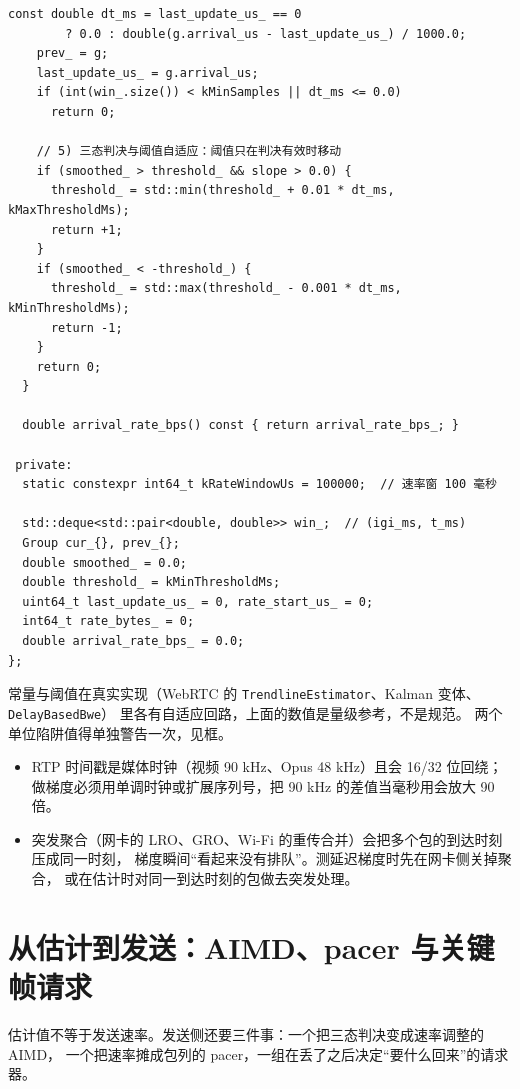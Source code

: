 \documentclass[12pt,a4paper,fontset=fandol]{ctexbook}
\newcommand{\Tp}[1]{\texttt{#1}}
\newcommand{\Bk}{\discretionary{}{}{}}
\begin{document}
\begin{lstlisting}[style=cppstyle,caption={接收侧延迟梯度与到达速率估计的最小骨架},label={lst:ch14-trendline}]
    const double dt_ms = last_update_us_ == 0
        ? 0.0 : double(g.arrival_us - last_update_us_) / 1000.0;
    prev_ = g;
    last_update_us_ = g.arrival_us;
    if (int(win_.size()) < kMinSamples || dt_ms <= 0.0)
      return 0;

    // 5) 三态判决与阈值自适应：阈值只在判决有效时移动
    if (smoothed_ > threshold_ && slope > 0.0) {
      threshold_ = std::min(threshold_ + 0.01 * dt_ms, kMaxThresholdMs);
      return +1;
    }
    if (smoothed_ < -threshold_) {
      threshold_ = std::max(threshold_ - 0.001 * dt_ms, kMinThresholdMs);
      return -1;
    }
    return 0;
  }

  double arrival_rate_bps() const { return arrival_rate_bps_; }

 private:
  static constexpr int64_t kRateWindowUs = 100000;  // 速率窗 100 毫秒

  std::deque<std::pair<double, double>> win_;  // (igi_ms, t_ms)
  Group cur_{}, prev_{};
  double smoothed_ = 0.0;
  double threshold_ = kMinThresholdMs;
  uint64_t last_update_us_ = 0, rate_start_us_ = 0;
  int64_t rate_bytes_ = 0;
  double arrival_rate_bps_ = 0.0;
};
\end{lstlisting}

常量与阈值在真实实现（WebRTC 的 \Tp{Trendlin{\Bk}eEstimat{\Bk}or}、Kalman 变体、\Tp{DelayBas{\Bk}edBwe}）
里各有自适应回路，上面的数值是量级参考，不是规范。
两个单位陷阱值得单独警告一次，见框。

\begin{warning}[title={时戳与单位的两个经典错误}]
\begin{itemize}
\item RTP 时间戳是媒体时钟（视频 90 kHz、Opus 48 kHz）且会 16/32 位回绕；
      做梯度必须用单调时钟或扩展序列号，把 90 kHz 的差值当毫秒用会放大 90 倍。
\item 突发聚合（网卡的 LRO、GRO、Wi-Fi 的重传合并）会把多个包的到达时刻压成同一时刻，
      梯度瞬间``看起来没有排队''。测延迟梯度时先在网卡侧关掉聚合，
      或在估计时对同一到达时刻的包做去突发处理。
\end{itemize}
\end{warning}

\section{从估计到发送：AIMD、pacer 与关键帧请求}

估计值不等于发送速率。发送侧还要三件事：一个把三态判决变成速率调整的 AIMD，
一个把速率摊成包列的 pacer，一组在丢了之后决定``要什么回来''的请求器。
\end{document}
